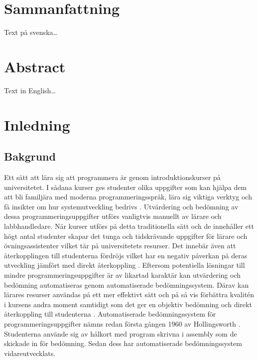 \documentclass[a4paper,11pt]{article}
\begin{document}
{\newpage

\mbox{}

\newpage

\section*{Sammanfattning}

Text på svenska\ldots

\newpage

\mbox{}

\newpage

\section*{Abstract}

Text in English\ldots

\newpage

\mbox{}

\newpage
\tableofcontents
\newpage
\ifodd\value{page}\else\mbox{}\newpage\fi
\setcounter{page}{1}
\renewcommand{\thepage}{\rempage}

\section{Inledning}

\subsection{Bakgrund}

Ett sätt att lära sig att programmera är genom introduktionskurser på universitetet. I sådana kurser ges studenter olika uppgifter som kan hjälpa dem att bli familjära med moderna programmeringsspråk, lära sig viktiga verktyg och få insikter om hur systemutveckling bedrivs \cite{douce_11}. Utvärdering och bedömning av dessa programmeringsuppgifter utförs vanligtvis manuellt av lärare och labbhandledare. När kurser utförs på detta traditionella sätt och de innehåller ett högt antal studenter skapar det tunga och tidskrävande uppgifter för lärare och övningsassistenter vilket tär på universitetets resurser. Det innebär även att återkopplingen till studenterna fördröjs vilket har en negativ påverkan på deras utveckling jämfört med direkt återkoppling \cite{japanerna_1}. Eftersom potentiella lösningar till mindre programmeringsuppgifter är av likartad karaktär kan utvärdering och bedömning automatiseras genom automatiserade bedömningssystem. Därav kan lärares resurser användas på ett mer effektivt sätt och på så vis förbättra kvalitén i kursens andra moment samtidigt som det ger en objektiv bedömning och direkt återkoppling till studenterna \cite{douce_11} \cite{hollingsworth_2} \cite{higgins_3}. Automatiserade bedömningssystem för programmeringsuppgifter nämns redan första gången 1960 av Hollingsworth \cite{hollingsworth_2}. Studenterna använde sig av hålkort med program skrivna i assembly som de skickade in för bedömning. Sedan dess har automatiserade bedömningssystem vidareutvecklats.

}
\end{document}
